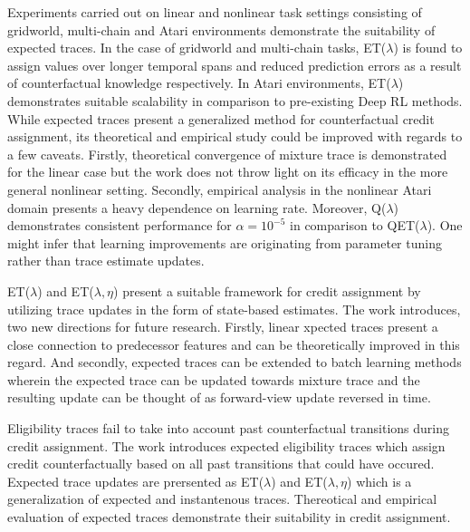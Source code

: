 \documentclass[11pt,letterpaper]{article}
\begin{document}
Experiments carried out on linear and nonlinear task settings consisting of gridworld, multi-chain and Atari environments demonstrate the suitability of expected traces. In the case of gridworld and multi-chain tasks, ET($\lambda$) is found to assign values over longer temporal spans and reduced prediction errors as a result of counterfactual knowledge respectively. In Atari environments, ET($\lambda$) demonstrates suitable scalability in comparison to pre-existing Deep RL methods. While expected traces present a generalized method for counterfactual credit assignment, its theoretical and empirical study could be improved with regards to a few caveats. Firstly, theoretical convergence of mixture trace is demonstrated for the linear case but the work does not throw light on its efficacy in the more general nonlinear setting. Secondly, empirical analysis in the nonlinear Atari domain presents a heavy dependence on learning rate. Moreover, Q($\lambda$) demonstrates consistent performance for $\alpha=10^{-5}$ in comparison to QET($\lambda$). One might infer that learning improvements are originating from parameter tuning rather than trace estimate updates. 

ET($\lambda$) and ET($\lambda,\eta$) present a suitable framework for credit assignment by utilizing trace updates in the form of state-based estimates. The work introduces, two new directions for future research. Firstly, linear xpected traces present a close connection to predecessor features and can be theoretically improved in this regard. And secondly, expected traces can be extended to batch learning methods wherein the expected trace can be updated towards mixture trace and the resulting update can be thought of as forward-view update reversed in time. 

Eligibility traces fail to take into account past counterfactual transitions during credit assignment. The work introduces expected eligibility traces which assign credit counterfactually based on all past transitions that could have occured. Expected trace updates are prersented as ET($\lambda$) and ET($\lambda,\eta$) which is a generalization of expected and instantenous traces. Thereotical and empirical evaluation of expected traces demonstrate their suitability in credit assignment. 
\end{document}
